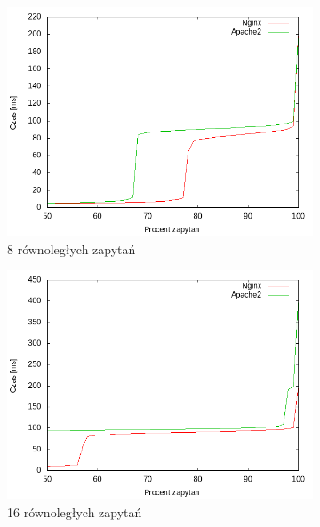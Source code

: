 \begin{figure}
	\begin{subfigure}[h]{0.3\textwidth}
		\includegraphics[width=\textwidth]{testy/wybor_fib_5_8.png}
		\caption{8 równoległych zapytań}
	\end{subfigure}
	\begin{subfigure}[h]{0.3\textwidth}
		\includegraphics[width=\textwidth]{testy/wybor_fib_5_16.png}
		\caption{16 równoległych zapytań}
	\end{subfigure}
	\begin{subfigure}[h]{0.3\textwidth}

\end{subfigure}
\end{figure}
